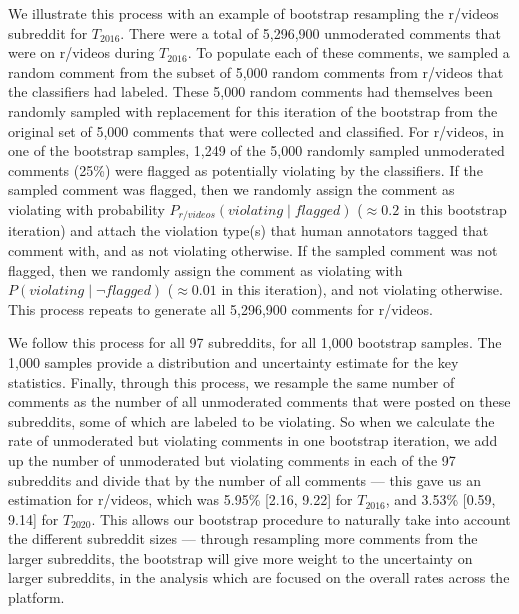 We illustrate this process with an example of bootstrap resampling the r/videos subreddit for $T_{2016}$. There were a total of 5,296,900 unmoderated comments that were on r/videos during $T_{2016}$. To populate each of these comments, we sampled a random comment from the subset of 5,000 random comments from r/videos that the classifiers had labeled. These 5,000 random comments had themselves been randomly sampled with replacement for this iteration of the bootstrap from the original set of 5,000 comments that were collected and classified. For r/videos, in one of the bootstrap samples, 1,249 of the 5,000 randomly sampled unmoderated comments (25\%) were flagged as potentially violating by the classifiers. If the sampled comment was flagged, then we randomly assign the comment as violating with probability $P_{r/videos}(violating \mid flagged)$ ($\approx 0.2$ in this bootstrap iteration) and attach the violation type(s) that human annotators tagged that comment with, and as not violating otherwise. If the sampled comment was not flagged, then we randomly assign the comment as violating with $P(violating \mid \lnot flagged)$ ($\approx 0.01$ in this iteration), and not violating otherwise. This process repeats to generate all 5,296,900 comments for r/videos.

We follow this process for all 97 subreddits, for all 1,000 bootstrap samples. The 1,000 samples provide a distribution and uncertainty estimate for the key statistics. Finally, through this process, we resample the same number of comments as the number of all unmoderated comments that were posted on these subreddits, some of which are labeled to be violating. So when we calculate the rate of unmoderated but violating comments in one bootstrap iteration, we add up the number of unmoderated but violating comments in each of the 97 subreddits and divide that by the number of all comments --- this gave us an estimation for r/videos, which was 5.95\% [2.16, 9.22] for $T_{2016}$, and 3.53\% [0.59, 9.14] for $T_{2020}$. This allows our bootstrap procedure to naturally take into account the different subreddit sizes --- through resampling more comments from the larger subreddits, the bootstrap will give more weight to the uncertainty on larger subreddits, in the analysis which are focused on the overall rates across the platform.

